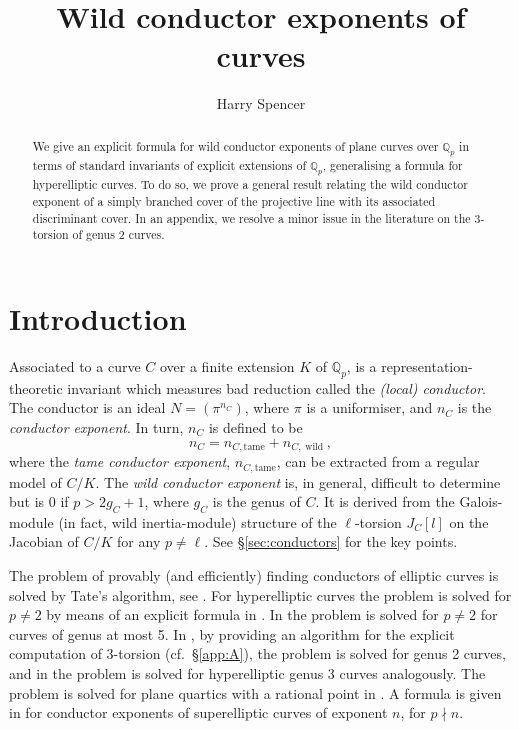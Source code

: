 \documentclass[12pt]{amsart}
\title{Wild conductor exponents of curves}
\author{Harry Spencer}
\theoremstyle{definition}
\theoremstyle{remark}
\newcommand{\QQ}{\mathbb{Q}}
\DeclareMathOperator{\wild}{wild}
\begin{document}
\begin{abstract}
    We give an explicit formula for wild conductor exponents of plane curves over $\QQ_p$ in terms of standard invariants of explicit extensions of $\QQ_p$, generalising a formula for hyperelliptic curves. To do so, we prove a general result relating the wild conductor exponent of a simply branched cover of the projective line with its associated discriminant cover. In an appendix, we resolve a minor issue in the literature on the $3$-torsion of genus 2 curves.
\end{abstract}

\maketitle

\tableofcontents 


\section{Introduction}

Associated to a curve ${C}$ over a finite extension $K$ of $\QQ_p$, is a representation-theoretic invariant which measures bad reduction called the \textit{(local) conductor}. The conductor is an ideal $N=(\pi^{n_{{C}}})$, where $\pi$ is a uniformiser, and $n_C$ is the \textit{conductor exponent}. In turn, $n_{C}$ is defined to be
\[n_{{C}} = n_{{C},\text{tame}} + n_{{C},\wild},\]
where the \textit{tame conductor exponent}, $n_{{C},\text{tame}}$, can be extracted from a regular model of ${C}/K$. The \textit{wild conductor exponent} is, in general, difficult to determine but is 0 if $p>2g_{C}+1$, where $g_{C}$ is the genus of ${C}$. It is derived from the Galois-module (in fact, wild inertia-module) structure of the $\ell$-torsion $J_{C}[l]$ on the Jacobian of ${C}/K$ for any $p\ne\ell$. See \S\ref{sec:conductors} for the key points.

The problem of provably (and efficiently) finding conductors of elliptic curves is solved by Tate's algorithm, see \cite[Chapter 4]{SilvermanAdvanced}. For hyperelliptic curves the problem is solved for $p\ne2$ by means of an explicit formula in \cite[Theorem 11.3]{M2D2}. In \cite{Lupoian2022} the problem is solved for $p\ne2$ for curves of genus at most 5. In \cite[\S4]{DokDoris}, by providing an algorithm for the explicit computation of 3-torsion (cf.\ \S\ref{app:A}), the problem is solved for genus 2 curves, and in \cite[\S3]{Lupoian2022_Genus3} the problem is solved for hyperelliptic genus 3 curves analogously. The problem is solved for plane quartics with a rational point in \cite[Theorem 2]{LupoianRawson2024}. A formula is given in \cite[Theorem 4.1.4]{KohlsThesis} for conductor exponents of superelliptic curves of exponent $n$, for $p\nmid n$.
\end{document}
